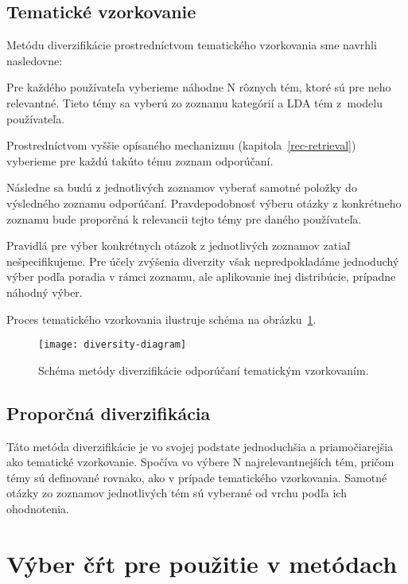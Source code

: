 \subsection{Tematické vzorkovanie}
Metódu diverzifikácie prostredníctvom tematického vzorkovania sme navrhli nasledovne:

\begin{my_enumerate}
\item{
  Pre každého používateľa vyberieme náhodne N rôznych tém, ktoré sú pre neho relevantné. Tieto témy sa vyberú zo zoznamu
  kategórií a LDA tém z~modelu používateľa.
}
\item{
  Prostredníctvom vyššie opísaného mechanizmu (kapitola~\ref{rec-retrieval}) vyberieme pre každú takúto tému zoznam
  odporúčaní.
}
\item{
  Následne sa budú z jednotlivých zoznamov vyberať samotné položky do výsledného zoznamu odporúčaní. Pravdepodobnosť výberu
  otázky z konkrétneho zoznamu bude proporčná k relevancii tejto témy pre daného používateľa.
}
\item{
  Pravidlá pre výber konkrétnych otázok z jednotlivých zoznamov zatiaľ nešpecifikujeme. Pre účely zvýšenia diverzity však
  nepredpokladáme jednoduchý výber podľa poradia v rámci zoznamu, ale aplikovanie inej distribúcie, prípadne náhodný výber.
}
\end{my_enumerate}

Proces tematického vzorkovania ilustruje schéma na obrázku~\ref{fig:tematic-sampling}.

\begin{figure}[H]\begin{center}
\texttt{[image: diversity-diagram]}
\caption{Schéma metódy diverzifikácie odporúčaní tematickým vzorkovaním.\label{fig:tematic-sampling}}\end{center}
\end{figure}


\subsection{Proporčná diverzifikácia}
Táto metóda diverzifikácie je vo svojej podstate jednoduchšia a priamočiarejšia ako tematické vzorkovanie. Spočíva
vo výbere N najrelevantnejších tém, pričom témy sú definované rovnako, ako v prípade tematického vzorkovania.
Samotné otázky zo zoznamov jednotlivých tém sú vyberané od vrchu podľa ich ohodnotenia.


\section{Výber čŕt pre použitie v metódach}\label{features}

